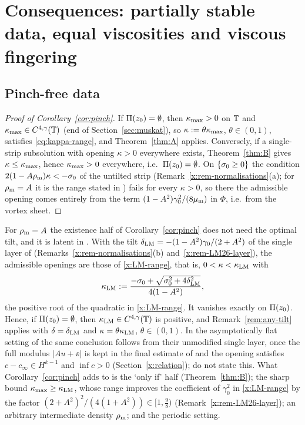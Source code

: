 \section{Consequences: partially stable data, equal viscosities and viscous fingering}\label{sec:applications}

\subsection{Pinch-free data}
\begin{proof}[Proof of Corollary~\ref{cor:pinch}]
If $\Pi(z_0)=\emptyset$, then $\kappa_{\max}>0$ on $\mathbb{T}$ and $\kappa_{\max}\in C^{4,\gamma}(\mathbb{T})$ (end of Section~\ref{sec:muskat}), so $\kappa:=\theta\kappa_{\max}$, $\theta\in(0,1)$, satisfies \eqref{eq:kappa-range}, and
Theorem~\ref{thm:A} applies. Conversely, if a single-strip subsolution with opening $\kappa>0$ everywhere exists, Theorem~\ref{thm:B} gives $\kappa\le\kappa_{\max}$, hence $\kappa_{\max}>0$ everywhere, i.e.\
$\Pi(z_0)=\emptyset$. On $\{\sigma_0\ge0\}$ the condition $2(1-A\rho_{\mathrm m})\kappa<-\sigma_0$ of the untilted strip (Remark~\ref{x:rem-normalisations}(a); for $\rho_{\mathrm m}=A$ it is the range stated in
\cite{LM26}) fails for every $\kappa>0$, so there the admissible opening comes entirely from the term $(1-A^2)\gamma_0^2/(8\mu_{\mathrm m})$ in $\Phi$, i.e.\ from the vortex sheet.
\end{proof}

For $\rho_{\mathrm m}=A$ the existence half of Corollary~\ref{cor:pinch} does not need the optimal tilt, and it is latent in \cite{LM26}. With the tilt $\delta_{\rm LM}=-(1-A^2)\gamma_0/(2+A^2)$ of the single
layer of \cite{LM26} (Remarks~\ref{x:rem-normalisations}(b) and~\ref{x:rem-LM26-layer}), the admissible openings are those of \eqref{x:LM-range}, that is, $0<\kappa<\kappa_{\rm LM}$ with
\[
\kappa_{\rm LM}:=\frac{-\sigma_0+\sqrt{\sigma_0^2+4\delta_{\rm LM}^2}}{4(1-A^2)} ,
\]
the positive root of the quadratic in \eqref{x:LM-range}. It vanishes exactly on $\Pi(z_0)$. Hence, if $\Pi(z_0)=\emptyset$, then $\kappa_{\rm LM}\in C^{4,\gamma}(\mathbb{T})$ is positive, and
Remark~\ref{rem:any-tilt} applies with $\delta=\delta_{\rm LM}$ and $\kappa=\theta\kappa_{\rm LM}$, $\theta\in(0,1)$. In the asymptotically flat setting of \cite{LM26} the same conclusion follows from their
unmodified single layer, once the full modulus $|Au+\ee|$ is kept in the final estimate of \cite[Sec.~7.4]{LM26} and the opening satisfies $c-c_\infty\in H^{k-1}$ and $\inf c>0$
(Section~\ref{x:relation}); \cite{LM26} do not state this. What Corollary~\ref{cor:pinch} adds to \cite{LM26} is the `only if' half (Theorem~\ref{thm:B}); the sharp bound $\kappa_{\max}\ge\kappa_{\rm LM}$,
whose range improves the coefficient of $\gamma_0^2$ in \eqref{x:LM-range} by the factor $(2+A^2)^2/(4(1+A^2))\in[1,\frac98)$ (Remark~\ref{x:rem-LM26-layer}); an arbitrary intermediate density
$\rho_{\mathrm m}$; and the periodic setting.

